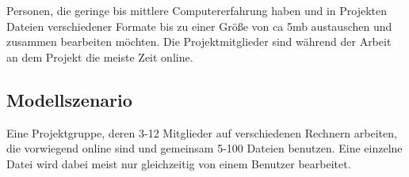 Personen, die geringe bis mittlere Computererfahrung haben und in Projekten Dateien verschiedener Formate bis zu einer Größe von ca 5mb austauschen und zusammen bearbeiten möchten. Die Projektmitglieder sind während der Arbeit an dem Projekt die meiste Zeit online.
\subsection{Modellszenario}

Eine Projektgruppe, deren 3-12 Mitglieder auf verschiedenen Rechnern arbeiten, die vorwiegend online sind und gemeinsam 5-100 Dateien benutzen. Eine einzelne Datei wird dabei meist nur gleichzeitig von einem Benutzer bearbeitet.
